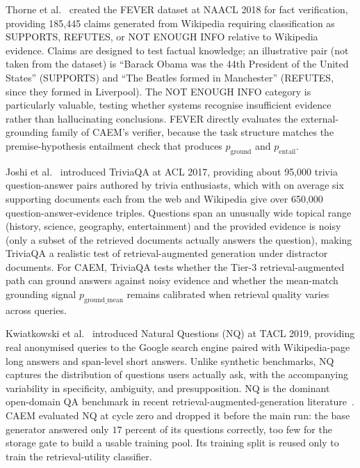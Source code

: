 Thorne et al.~\cite{thorne-etal-2018-fever} created the FEVER dataset at NAACL 2018 for fact verification, providing 185{,}445 claims generated from Wikipedia requiring classification as SUPPORTS, REFUTES, or NOT ENOUGH INFO relative to Wikipedia evidence. Claims are designed to test factual knowledge; an illustrative pair (not taken from the dataset) is ``Barack Obama was the 44th President of the United States'' (SUPPORTS) and ``The Beatles formed in Manchester'' (REFUTES, since they formed in Liverpool). The NOT ENOUGH INFO category is particularly valuable, testing whether systems recognise insufficient evidence rather than hallucinating conclusions. FEVER directly evaluates the external-grounding family of CAEM's verifier, because the task structure matches the premise-hypothesis entailment check that produces $p_{\text{ground}}$ and $p_{\text{entail}}$.

Joshi et al.~\cite{joshi-etal-2017-triviaqa} introduced TriviaQA at ACL 2017, providing about 95{,}000 trivia question-answer pairs authored by trivia enthusiasts, which with on average six supporting documents each from the web and Wikipedia give over 650{,}000 question-answer-evidence triples. Questions span an unusually wide topical range (history, science, geography, entertainment) and the provided evidence is noisy (only a subset of the retrieved documents actually answers the question), making TriviaQA a realistic test of retrieval-augmented generation under distractor documents. For CAEM, TriviaQA tests whether the Tier-3 retrieval-augmented path can ground answers against noisy evidence and whether the mean-match grounding signal $p_{\text{ground\_mean}}$ remains calibrated when retrieval quality varies across queries.

Kwiatkowski et al.~\cite{kwiatkowski-etal-2019-natural} introduced Natural Questions (NQ) at TACL 2019, providing real anonymised queries to the Google search engine paired with Wikipedia-page long answers and span-level short answers. Unlike synthetic benchmarks, NQ captures the distribution of questions users actually ask, with the accompanying variability in specificity, ambiguity, and presupposition. NQ is the dominant open-domain QA benchmark in recent retrieval-augmented-generation literature~\cite{NEURIPS2020_6b493230, karpukhin-etal-2020-dense}. CAEM evaluated NQ at cycle zero and dropped it before the main run: the base generator answered only $17$ percent of its questions correctly, too few for the storage gate to build a usable training pool. Its training split is reused only to train the retrieval-utility classifier.

